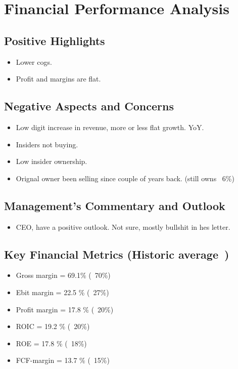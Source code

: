 \documentclass[a4paper, 12pt, oneside]{article} %
\begin{document}
\section{Financial Performance Analysis}

\subsection{Positive Highlights}
\begin{itemize}
	\item Lower cogs.
	\item	Profit and margins are flat.
\end{itemize}

\subsection{Negative Aspects and Concerns}
\begin{itemize}
	\item Low digit increase in revenue, more or less flat growth. YoY.
	\item Insiders not buying.
	\item Low insider ownership.
	\item Orignal owner been selling since couple of years back. (still owns ~6\%)
\end{itemize}

\subsection{Management's Commentary and Outlook}
\begin{itemize}
	\item CEO, have a positive outlook. Not sure, mostly bullshit in hes letter.
\end{itemize}




\subsection{Key Financial Metrics (Historic average~)}
\begin{itemize}
	\item Gross margin = 69.1\% (~70\%)
	\item Ebit margin = 22.5 \% (~27\%)
	\item Profit margin = 17.8 \% (~20\%)
	\item ROIC = 19.2 \% (~20\%)
	\item ROE = 17.8 \% (~18\%)
	\item FCF-margin = 13.7 \% (~15\%)
\end{itemize}
\end{document}
